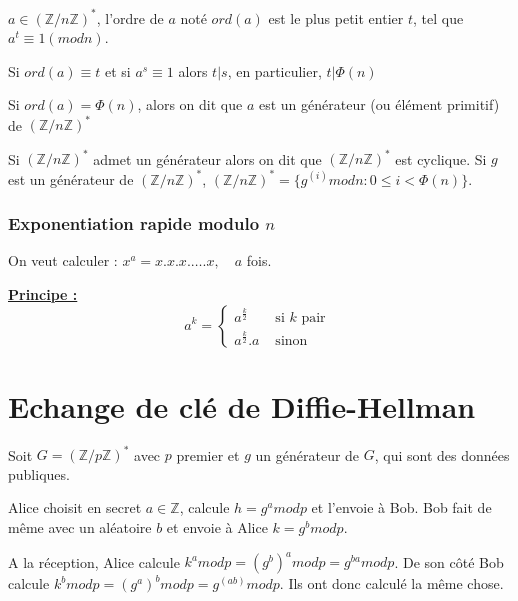 \documentclass[a4paper, 10pt]{thesis}
\begin{document}
\begin{df}
    $a \in (\mathbb{Z} / n\mathbb{Z})^*$, l'ordre de $a$ noté $ord(a)$ est le plus petit entier $t$,
    tel que $a^t \equiv 1 (mod n)$.
\end{df}

\begin{prop}
    Si $ord(a) \equiv t$ et si $a^s \equiv 1$ alors $t|s$, en particulier, $t|\Phi(n)$
\end{prop}

\begin{df}
    Si $ord(a) = \Phi(n)$, alors on dit que $a$ est un générateur (ou élément primitif) de
    $(\mathbb{Z}/n\mathbb{Z})^*$
\end{df}

Si $(\mathbb{Z}/ n\mathbb{Z})^*$ admet un générateur alors on dit que $(\mathbb{Z}/n\mathbb{Z})^*$
est cyclique. Si $g$ est un générateur de $(\mathbb{Z}/n\mathbb{Z})^*$, $(\mathbb{Z}/n\mathbb{Z})^*
= \{g^{(i)} mod n : 0 \leq i < \Phi(n)\}$.

\subsubsection{Exponentiation rapide modulo $n$}

On veut calculer : $x^a = x.x.x. \dots . x,\quad a$ fois.

\underline{\textbf{Principe :}} \begin{displaymath}
    a^k = \left \lbrace
    \begin{array}{rl}
        a^{\frac{k}{2}} & \mbox{ si } k \mbox{ pair } \\
        a^{\frac{k}{2}} . a & \mbox{ sinon }
    \end{array}
    \right .
\end{displaymath}


\section{Echange de clé de Diffie-Hellman}

Soit $G = (\mathbb{Z}/p\mathbb{Z})^*$ avec $p$ premier et $g$ un générateur de $G$, qui sont des
données publiques.

Alice choisit en secret $a \in \mathbb{Z}$, calcule $h = g^a mod p$ et l'envoie à Bob. Bob fait de
même avec un aléatoire $b$ et envoie à Alice $k = g^b mod p$.

A la réception, Alice calcule $k^a mod p = (g^b)^a mod p = g^{ba} mod p$. De son côté Bob calcule
$k^b mod p = (g^a)^b mod p = g^(ab) mod p$. Ils ont donc calculé la même chose.
\end{document}
